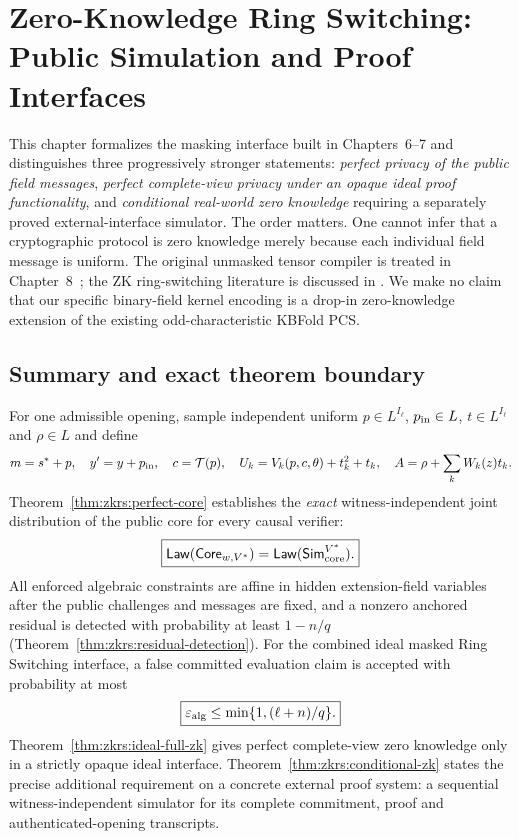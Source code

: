 \section{Zero-Knowledge Ring Switching: Public Simulation and Proof Interfaces}\label{sec:zkrs}
This chapter formalizes the masking interface built in Chapters~6--7
and distinguishes three progressively stronger statements:
\emph{perfect privacy of the public field messages},
\emph{perfect complete-view privacy under an opaque ideal proof
functionality}, and \emph{conditional real-world zero knowledge}
requiring a separately proved external-interface simulator.
The order matters. One cannot infer that a cryptographic protocol
is zero knowledge merely because each individual field message
is uniform. The original unmasked tensor compiler is treated
in Chapter~8~\cite{DiamondPosen2024}; the ZK ring-switching
literature is discussed in
\cite{Kochergin2026,FrigoShelat2026}.
We make no claim that our specific binary-field kernel encoding
is a drop-in zero-knowledge extension of the existing
odd-characteristic KBFold PCS.









\subsection{Summary and exact theorem boundary}\label{sec:zkrs:conclusion}

For one admissible opening, sample independent uniform
$p\in L^{I_\ell}$, $p_{\rm in}\in L$, $t\in L^{I_\ell}$
and $\rho\in L$ and define
\[
 m=s^*+p,\quad y'=y+p_{\rm in},\quad c=\mathcal T(p),\quad
 U_k=V_k(p,c,\theta)+t_k^2+t_k,\quad
 A=\rho+\sum_kW_k(z)t_k.
\]
Theorem~\ref{thm:zkrs:perfect-core} establishes the
\emph{exact} witness-independent joint distribution of
the public core for every causal verifier:
\[
 \boxed{
 \mathsf{Law}(\mathsf{Core}_{w,V^*})
 =\mathsf{Law}(\mathsf{Sim}_{\rm core}^{V^*}).
 }
\]
All enforced algebraic constraints are affine in hidden
extension-field variables after the public challenges
and messages are fixed, and a nonzero anchored residual
is detected with probability at least $1-n/q$
(Theorem~\ref{thm:zkrs:residual-detection}).
For the combined ideal masked Ring Switching interface,
a false committed evaluation claim is accepted with probability
at most
\[
 \boxed{\varepsilon_{\rm alg}\leq
         \min\{1,(\ell+n)/q\}.}
\]
Theorem~\ref{thm:zkrs:ideal-full-zk} gives perfect complete-view
zero knowledge only in a strictly opaque ideal interface.
Theorem~\ref{thm:zkrs:conditional-zk} states the precise
additional requirement on a concrete external proof system:
a sequential witness-independent simulator for its complete
commitment, proof and authenticated-opening transcripts.

